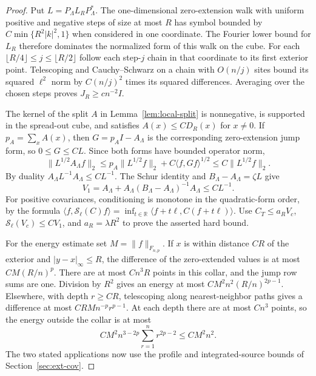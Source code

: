 \documentclass[11pt]{article}
\theoremstyle{definition}
\begin{document}
\begin{proof}
Put \(L=P_\Lambda L_RP_\Lambda^*\). The
one-dimensional zero-extension walk with uniform positive and
negative steps of size at most \(R\) has symbol bounded by
\(C\min\{R^2|k|^2,1\}\) when considered in one coordinate.
The Fourier lower bound for \(L_R\) therefore dominates the
normalized form of this walk on the cube. For each
\(\lfloor R/4\rfloor\le j\le\lfloor R/2\rfloor\) follow
each step-\(j\) chain in that coordinate to its first exterior
point. Telescoping and Cauchy--Schwarz on a chain with
\(O(n/j)\) sites bound its squared \(\ell^2\) norm by
\(C(n/j)^2\) times its squared differences. Averaging over
the chosen steps proves
\(J_R\ge c n^{-2}I\).

The kernel of the split \(A\) in
Lemma~\ref{lem:local-split} is nonnegative, is supported
in the spread-out cube, and satisfies \(A(x)\le C D_R(x)\)
for \(x\ne0\). If \(p_A=\sum_x A(x)\), then
\(G=p_A I-A_\Lambda\) is the corresponding zero-extension
jump form, so \(0\le G\le C L\). Since both forms have
bounded operator norm,
\begin{equation}
 \|L^{1/2}A_\Lambda f\|_2
 \le p_A\|L^{1/2}f\|_2+
 C\langle f,G f\rangle^{1/2}
 \le C\|L^{1/2}f\|_2 .
\end{equation}
By duality \(A_\Lambda L^{-1}A_\Lambda\le C L^{-1}\).
The Schur identity and \(B_\Lambda-A_\Lambda=\zeta L\)
give
\begin{equation}
 V_1=A_\Lambda+A_\Lambda(B_\Lambda-A_\Lambda)^{-1}A_\Lambda
 \le C L^{-1}.
\end{equation}
For positive covariances, conditioning is monotone in the
quadratic-form order, by the formula
\(
 \langle f,\mathcal S_\ell(C)f\rangle=
 \inf_{t\in\mathbb R}\langle f+t\ell,C(f+t\ell)\rangle
\).
Use \(C_T\le a_R V_c\),
\(\mathcal S_\ell(V_c)\le C V_1\), and \(a_R=\lambda R^2\)
to prove the asserted hard bound.

For the energy estimate set \(M=\|f\|_{F_{n,p}}\).
If \(x\) is within distance \(C R\) of the exterior and
\(|y-x|_\infty\le R\), the difference of the zero-extended
values is at most \(C M(R/n)^p\).
There are at most \(C n^3 R\) points in this collar, and
the jump row sums are one. Division by \(R^2\) gives an
energy at most \(C M^2 n^2 (R/n)^{2p-1}\).
Elsewhere, with depth \(r\ge C R\), telescoping along
nearest-neighbor paths gives a difference at most
\(C R M n^{-p} r^{p-1}\). At each depth there are at most
\(C n^3\) points, so the energy outside the collar is at most
\begin{equation}
 C M^2 n^{3-2p}\sum_{r=1}^n r^{2p-2}\le C M^2 n^2 .
\end{equation}
The two stated applications now use the profile and
integrated-source bounds of Section~\ref{sec:ext-cov}.
\end{proof}
\end{document}
